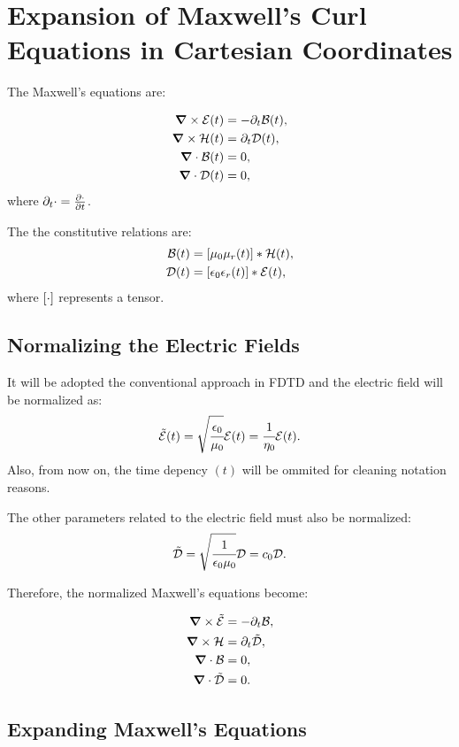 \section{Expansion of Maxwell's Curl Equations in Cartesian Coordinates}

The Maxwell's equations are:

\begin{align}
    \bm{\nabla}\times \mathcal{E}(t) &= -\partial _t \mathcal{B}(t), \\
    \bm{\nabla}\times \mathcal{H}(t) &= \partial_t \mathcal{D}(t), \\
    \bm{\nabla}\cdot \mathcal{B}(t) &= 0, \\
    \bm{\nabla}\cdot \mathcal{D}(t) &= 0,
\end{align}
where $\partial_t\cdot = \frac{\partial \cdot}{\partial t}$.

The the constitutive relations are:
\begin{align}
    \Bt(t) &= \brackets{\mu_0\mu_r  (t)} \ast \Hht(t), \\
    \Dt(t) &= \brackets{\epsilon_0 \epsilon_r  (t)} \ast \Et(t),
\end{align}
where $\brackets{\cdot}$ represents a tensor.

\subsection{Normalizing the Electric Fields}
It will be adopted the conventional approach in FDTD and the electric field will be normalized as:
\begin{equation}
    \tilde{\mathcal{E}}(t) = \sqrt{\cfrac{\epsilon_0}{\mu_0}}\mathcal{E}(t) = \cfrac{1}{\eta_0}\mathcal{E}(t).
\end{equation}
Also, from now on, the time depency $(t)$ will be ommited for cleaning notation reasons.

The other parameters related to the electric field must also be normalized:
\begin{equation}
    \tilde{\mathcal{D}} = \sqrt{\cfrac{1}{\epsilon_0\mu_0}} \mathcal{D} = c_0 \mathcal{D}.
\end{equation}

Therefore, the normalized Maxwell's equations become:

\begin{align}
    \bm{\nabla}\times \tilde{\mathcal{E}} &= -\partial _t \mathcal{B}, \\
    \bm{\nabla}\times \mathcal{H} &= \partial_t \tilde{\mathcal{D}}, \\
    \bm{\nabla}\cdot \mathcal{B} &= 0, \\
    \bm{\nabla}\cdot \tilde{\mathcal{D}} &= 0.
\end{align}


\subsection{Expanding Maxwell's Equations}

